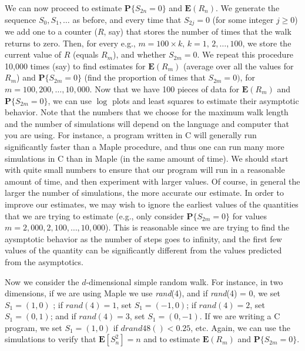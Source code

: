 \documentclass{stml-l}
\theoremstyle{definition}
\numberwithin{equation}{chapter}
\numberwithin{figure}{chapter}
\numberwithin{figure}{section}
\begin{document}
We can now proceed to estimate $\mathbf{P}\{S_{2n}=0\}$ and
$\mathbf{E}(R_{n})$. We generate the sequence $S_{0},S_{1},\ldots$
as before, and every time that $S_{2j}= 0$ (for some integer $j\geq
0$) we add one to a counter ($R$, say) that stores the number of
times that the walk returns to zero. Then, for every e.g.,
$m=100\times k,\,k=1,\,2,\ldots,100$, we store the current value of $R$
(equals $R_{m}$), and whether $S_{2m}=0$. We repeat this procedure
10,000 times (say) to find estimates for $\mathbf{E}(R_{m})$
(average over all the values for $R_{m}$) and
$\mathbf{P}\{S_{2m}=0\}$ (find the proportion of times that
$S_{2m}=0)$, for $m=100,200,\ldots,10,000$. Now that we have 100
pieces of data for $\mathbf{E}(R_{m})$ and $\mathbf{P}\{S_{2m}=0\}$,
we can use $\log$ plots and least squares to estimate their
asymptotic behavior. Note that the numbers that we choose for the
maximum walk length and the number of simulations will depend on the
language and computer that you are using. For instance, a program
written in $\mathrm{C}$ will generally run significantly faster than
a Maple procedure, and thus one can run many more simulations in
$\mathrm{C}$ than in Maple (in the same amount of time). We should
start with quite small numbers to ensure that our program will run
in a reasonable amount of time, and then experiment with larger
values. Of course, in general the larger the number of simulations,
the more accurate our estimate. In order to improve our estimates,
we may wish to ignore the earliest values of the quantities that we
are trying to estimate (e.g., only consider $\mathbf{P}\{S_{2m}=0\}$
for values $m=2,000,2,100,\ldots,10,000$). This is reasonable since
we are trying to find the aysmptotic behavior as the number of steps
goes to infinity, and the first few values of the quantity can be
significantly different from the values predicted from the
asymptotics.

Now we consider the $d$-dimensional simple random walk. For
instance, in two dimensions, if we are using Maple we use
\emph{rand}(4), and if \emph{rand}(4) = 0, we set $S_{1}=(1,0)$ ; if
$rand(4)=1$, set $S_{1}=(-1,0)$; if $rand(4)=2$, set $S_{1}=(0,1)$;
and if $rand(4)=3$, set $S_{1}=(0,-1)$. If we are writing a
$\mathrm{C}$ program, we set $S_{1}=(1,0)$ if $drand48()<0.25$, etc.
Again, we can use the simulations to verify that
$\mathbf{E}[S_{n}^{2}]=n$ and to estimate $\mathbf{E}(R_{m})$ and
$\mathbf{P}\{S_{2m}=0\}$.
\end{document}
